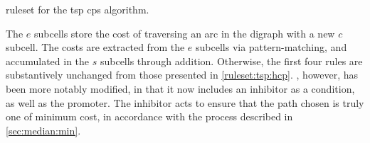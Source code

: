 \begin{cprulesetfloat}
    \begin{cpruleset}
        
        
        
        
        
        
    \end{cpruleset}
    \caption[\Gls{ruleset} for the ]{\label{ruleset:tsp:tsp}\Gls{ruleset} for the \gls{tsp} \gls{cps} algorithm.}
\end{cprulesetfloat}

The \(e\) subcells store the cost of traversing an arc in the digraph with a new \(c\) subcell.  The costs are extracted from the \(e\) subcells via pattern-matching, and accumulated in the \(s\) subcells through addition.  Otherwise, the first four rules are substantively unchanged from those presented in \cref{ruleset:tsp:hcp}.  , however, has been more notably modified, in that it now includes an \gls{inhibitor} as a condition, as well as the \gls{promoter}.  The \gls{inhibitor} acts to ensure that the path chosen is truly one of minimum cost, in accordance with the process described in \cref{sec:median:min}.

